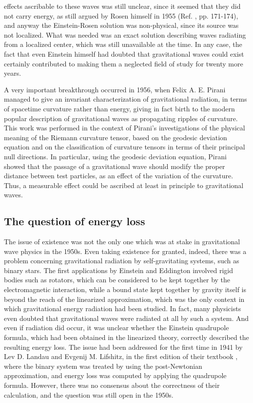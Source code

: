 \documentclass{ws-procs961x669}            %
\begin{document}
effects ascribable to these waves was still unclear, since it
seemed that they did not carry energy, as still argued by Rosen
himself in 1955 (Ref. , pp. 171-174), and anyway the
Einstein-Rosen solution was non-physical, since its source was not
localized. What was needed was an exact solution describing waves
radiating from a localized center, which was still unavailable at
the time. In any case, the fact that even Einstein himself had
doubted that gravitational waves could exist certainly contributed
to making them a neglected field of study for twenty more years.

A very important breakthrough occurred in 1956, when Felix A. E.
Pirani managed to give an invariant characterization of
gravitational radiation, in terms of spacetime curvature rather
than energy\cite{Pirani1,Pirani2}, giving in fact birth to the
modern popular description of gravitational waves as propagating
ripples of curvature. This work was performed in the context of
Pirani's investigations of the physical meaning of the Riemann
curvature tensor, based on the geodesic deviation
equation\cite{Synge:1934zza} and on the classification of
curvature tensors in terms of their principal null
directions\cite{Petrov}. In particular, using the geodesic
deviation equation, Pirani showed that the passage of a
gravitational wave should modify the proper distance between test
particles, as an effect of the variation of the curvature. Thus, a
measurable effect could be ascribed at least in principle to
gravitational waves.


\subsection{The question of energy loss}

The issue of existence was not the only one which was at stake in
gravitational wave physics in the 1950s. Even taking existence for
granted, indeed, there was a problem concerning gravitational
radiation by self-gravitating systems, such as binary stars. The
first applications by Einstein and Eddington involved rigid bodies
such as rotators, which can be considered to be kept together by
the electromagnetic interaction, while a bound state kept together
by gravity itself is beyond the reach of the linearized
approximation, which was the only context in which gravitational
energy radiation had been studied. In fact, many physicists even
doubted that gravitational waves were radiated at all by such a
system. And even if radiation did occur, it was unclear whether
the Einstein quadrupole formula, which had been obtained in the
linearized theory, correctly described the resulting energy loss.
The issue had been addressed for the first time in 1941 by Lev D.
Landau and Evgenij M. Lifshitz, in the first edition of their
textbook \cite{Landau}, where the binary system was treated by
using the post-Newtonian approximation, and energy loss was
computed by applying the quadrupole formula. However, there was no
consensus about the correctness of their calculation, and the
question was still open in the 1950s.
\end{document}
